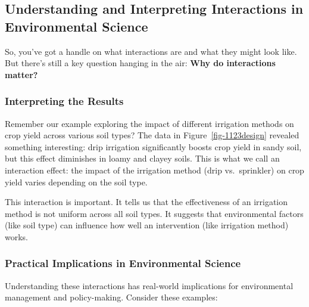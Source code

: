 \documentclass[
  letterpaper,
  DIV=11,
  numbers=noendperiod]{scrreprt}
\begin{document}
\subsection{Understanding and Interpreting Interactions in Environmental
Science}\label{understanding-and-interpreting-interactions-in-environmental-science}

So, you've got a handle on what interactions are and what they might
look like. But there's still a key question hanging in the air:
\textbf{Why do interactions matter?}

\subsubsection{Interpreting the Results}\label{interpreting-the-results}

Remember our example exploring the impact of different irrigation
methods on crop yield across various soil types? The data in
Figure~\ref{fig-1123design} revealed something interesting: drip
irrigation significantly boosts crop yield in sandy soil, but this
effect diminishes in loamy and clayey soils. This is what we call an
interaction effect: the impact of the irrigation method (drip
vs.~sprinkler) on crop yield varies depending on the soil type.

This interaction is important. It tells us that the effectiveness of an
irrigation method is not uniform across all soil types. It suggests that
environmental factors (like soil type) can influence how well an
intervention (like irrigation method) works.

\subsubsection{Practical Implications in Environmental
Science}\label{practical-implications-in-environmental-science}

Understanding these interactions has real-world implications for
environmental management and policy-making. Consider these examples:
\end{document}
